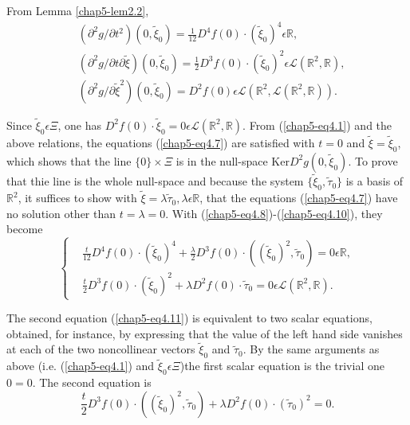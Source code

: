 From Lemma \ref{chap5-lem2.2},
\begin{align*}
& (\partial^{2} g/ \partial t^{2})(0, \widetilde{\xi}_{0}) =
  \frac{1}{12} D^{4}f(0) \cdot (\widetilde{\xi}_{0})^{4} \epsilon
  \mathbb{R},\tag{4.8}\label{chap5-eq4.8}\\
& (\partial^{2}g/\partial t \partial \widetilde{\xi})(0,
  \widetilde{\xi}_{0}) = \frac{1}{2} D^{3}f(0) \cdot
  (\widetilde{\xi}_{0})^{2} \epsilon \mathscr{L}(\mathbb{R}^{2},
  \mathbb{R}),\tag{4.9}\label{chap5-eq4.9}\\
& (\partial^{2}g/\partial \widetilde{\xi}^{2})(0, \widetilde{\xi}_{0})
  = D^{2}f(0) \epsilon \mathscr{L}(\mathbb{R}^{2},
  \mathscr{L}(\mathbb{R}^{2}, \mathbb{R})).\tag{4.10}\label{chap5-eq4.10}
\end{align*}

Since $\widetilde{\xi}_{0} \epsilon \Xi$, one has $D^{2}f(0) \cdot
\widetilde{\xi}_{0} = 0 \epsilon \mathscr{L}(\mathbb{R}^{2},
\mathbb{R})$. From (\ref{chap5-eq4.1}) and the above relations, the
equations (\ref{chap5-eq4.7}) are satisfied with $t = 0$ and
$\widetilde{\xi} = \widetilde{\xi}_{0}$, which shows that the line
$\{0\} \times \Xi$ is in the null-space Ker\pageoriginale $D^{2}g(0,
\widetilde{\xi}_{0})$. To prove that thie line is the whole null-space
and because the system $\{\widetilde{\xi}_{0}, \widetilde{\tau}_{0}\}$
is a basis of $\mathbb{R}^{2}$, it suffices to show with
$\widetilde{\xi} = \lambda\widetilde{\tau}_{0}, \lambda \epsilon
\mathbb{R}$, that the equations (\ref{chap5-eq4.7}) have no solution
other than $t = \lambda = 0$. With
(\ref{chap5-eq4.8})-(\ref{chap5-eq4.10}), they become
\begin{equation*}
\begin{cases}
& \frac{t}{12} D^{4}f(0) \cdot (\widetilde{\xi}_{0})^{4} +
\frac{\lambda}{2} D^{3}f(0) \cdot ((\widetilde{\xi}_{0})^{2},
\widetilde{\tau}_{0}) = 0 \epsilon \mathbb{R},\\
& \frac{t}{2} D^{3}f(0) \cdot (\widetilde{\xi}_{0})^{2} + \lambda
D^{2}f(0) \cdot \widetilde{\tau}_{0} = 0 \epsilon
\mathscr{L}(\mathbb{R}^{2}, \mathbb{R}).
\end{cases}\tag{4.11}\label{chap5-eq4.11}
\end{equation*}

The second equation (\ref{chap5-eq4.11}) is equivalent to two scalar
equations, obtained, for instance, by expressing that the value of the
left hand side vanishes at each of the two noncollinear vectors
$\widetilde{\xi}_{0}$ and $\widetilde{\tau}_{0}$. By the same
arguments as above (i.e. (\ref{chap5-eq4.1}) and $\widetilde{\xi}_{0}
\epsilon \Xi$)the first scalar equation is the trivial one $0 =
0$. The second equation is
\begin{equation*}
\frac{t}{2}D^{3}f(0) \cdot ((\widetilde{\xi}_{0})^{2},
\widetilde{\tau}_{0}) + \lambda D^{2}f(0) \cdot
(\widetilde{\tau}_{0})^{2} = 0.\tag{4.12}\label{chap5-eq4.12}
\end{equation*}

